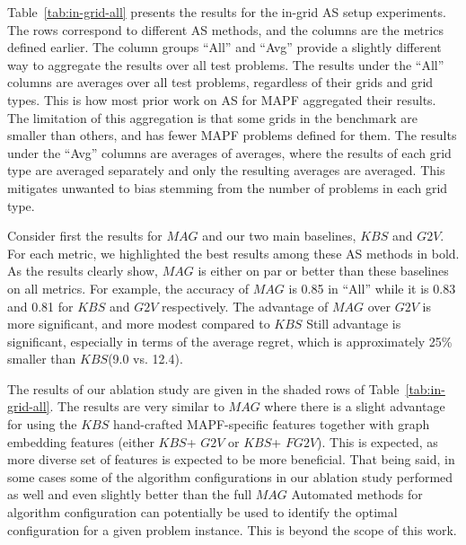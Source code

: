 \documentclass[letterpaper]{article} %
\newcommand{\Carmel}[1]{}
\newcommand{\Roni}[1]{}
\newcommand{\gtv}[1]{\ensuremath{\textit{G2V}}\xspace}
\newcommand{\fgtv}[1]{\ensuremath{\textit{FG2V}}\xspace}
\newcommand{\kaduri}[1]{\ensuremath{\textit{KBS}}\xspace}
\newcommand{\mapfgas}[1]{\ensuremath{\textit{MAG}}\xspace}
\begin{document}
Table~\ref{tab:in-grid-all} presents the results for the in-grid AS setup experiments.
The rows correspond to different AS methods, and the columns are the metrics defined earlier.
The column groups ``All'' and ``Avg'' provide a slightly different way to aggregate the results over all test problems.
The results under the ``All'' columns are averages over all test problems, regardless of their grids and grid types.
This is how most prior work on AS for MAPF aggregated their results.
The limitation of this aggregation is that some grids in the benchmark are smaller than others, and has fewer MAPF problems defined for them.
The results under the ``Avg'' columns are averages of averages, where the results of each grid type are averaged separately and only the resulting averages are averaged. This mitigates unwanted to bias stemming from the number of problems in each grid type.


Consider first the results for \mapfgas\ and our two main baselines, \kaduri\ and \gtv\ .
For each metric, we highlighted the best results among these AS methods in bold.
As the results clearly show, \mapfgas\ is either on par or better than these baselines on all metrics.
For example, the accuracy of \mapfgas\ is 0.85 in ``All'' while it is 0.83 and 0.81 for \kaduri\ and \gtv , respectively.
The advantage of \mapfgas\ over \gtv\ is more significant, and more modest compared to \kaduri.
Still advantage is significant, especially in terms of the average regret, which is approximately 25\% smaller than \kaduri\ (9.0 vs. 12.4).

The results of our ablation study are given in the shaded rows of Table~\ref{tab:in-grid-all}. The results are very similar to \mapfgas, where there is a slight advantage for using the \kaduri\ hand-crafted MAPF-specific features together with graph embedding features (either \kaduri\ + \gtv\ or \kaduri\ + \fgtv\ ).
This is expected, as more diverse set of features is expected to be more beneficial. That being said, in some cases some of the algorithm configurations in our ablation study performed as well and even slightly better than the full \mapfgas. Automated methods for algorithm configuration can potentially be used to identify the optimal configuration for a given problem instance. This is beyond the scope of this work.
\end{document}
